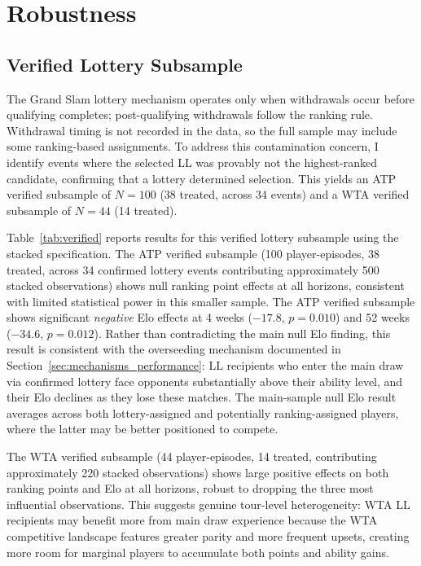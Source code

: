 \section{Robustness}
\label{sec:robustness}

\subsection{Verified Lottery Subsample}
\label{sec:robustness_verified}

The Grand Slam lottery mechanism operates only when withdrawals occur before qualifying completes; post-qualifying withdrawals follow the ranking rule. Withdrawal timing is not recorded in the data, so the full sample may include some ranking-based assignments. To address this contamination concern, I identify events where the selected LL was provably not the highest-ranked candidate, confirming that a lottery determined selection. This yields an ATP verified subsample of $N = 100$ (38 treated, across 34 events) and a WTA verified subsample of $N = 44$ (14 treated).

Table~\ref{tab:verified} reports results for this verified lottery subsample using the stacked specification. The ATP verified subsample (100 player-episodes, 38 treated, across 34 confirmed lottery events contributing approximately 500 stacked observations) shows null ranking point effects at all horizons, consistent with limited statistical power in this smaller sample. The ATP verified subsample shows significant \textit{negative} Elo effects at 4 weeks ($-17.8$, $p = 0.010$) and 52 weeks ($-34.6$, $p = 0.012$). Rather than contradicting the main null Elo finding, this result is consistent with the overseeding mechanism documented in Section~\ref{sec:mechanisms_performance}: LL recipients who enter the main draw via confirmed lottery face opponents substantially above their ability level, and their Elo declines as they lose these matches. The main-sample null Elo result averages across both lottery-assigned and potentially ranking-assigned players, where the latter may be better positioned to compete.

The WTA verified subsample (44 player-episodes, 14 treated, contributing approximately 220 stacked observations) shows large positive effects on both ranking points and Elo at all horizons, robust to dropping the three most influential observations. This suggests genuine tour-level heterogeneity: WTA LL recipients may benefit more from main draw experience because the WTA competitive landscape features greater parity and more frequent upsets, creating more room for marginal players to accumulate both points and ability gains.

